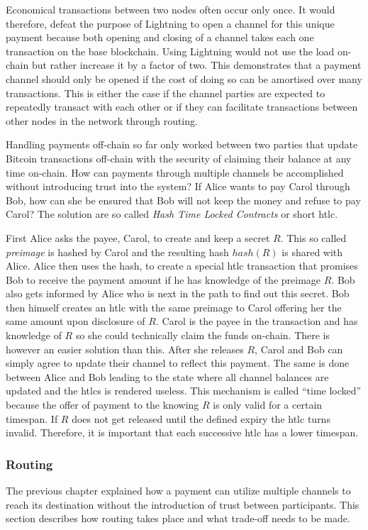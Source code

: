 \documentclass[final]{fhnwreport}       %
\begin{document}
Economical transactions between two nodes often occur only once. It would therefore, defeat the purpose of Lightning to open a channel for this unique payment because both opening and closing of a channel takes each one transaction on the base \gls{blockchain}. Using Lightning would not use the load on-chain but rather increase it by a factor of two. This demonstrates that a payment channel should only be opened if the cost of doing so can be amortised over many transactions. This is either the case if the channel parties are expected to repeatedly transact with each other or if they can facilitate transactions between other nodes in the network through routing. 

Handling payments off-chain so far only worked between two parties that update Bitcoin transactions off-chain with the security of claiming their balance at any time on-chain. How can payments through multiple channels be accomplished without introducing trust into the system? If Alice wants to pay Carol through Bob, how can she be ensured that Bob will not keep the money and refuse to pay Carol? The solution are so called \emph{Hash Time Locked Contracts} or short \gls{htlc}.

First Alice asks the payee, Carol, to create and keep a secret $R$. This so called \emph{\gls{preimage}} is hashed by Carol and the resulting \gls{hash} $hash(R)$ is shared with Alice. Alice then uses the \gls{hash}, to create a special \gls{htlc} transaction that promises Bob to receive the payment amount if he has knowledge of the preimage $R$. Bob also gets informed by Alice who is next in the path to find out this secret. Bob then himself creates an \gls{htlc} with the same preimage to Carol offering her the same amount upon disclosure of $R$. Carol is the payee in the transaction and has knowledge of $R$ so she could technically claim the funds on-chain. There is however an easier solution than this. After she releases $R$, Carol and Bob can simply agree to update their channel to reflect this payment. The same is done between Alice and Bob leading to the state where all channel balances are updated and the \gls{htlc}s is rendered useless. This mechanism is called ``time locked'' because the offer of payment to the knowing $R$ is only valid for a certain timespan. If $R$ does not get released until the defined expiry the \gls{htlc} turns invalid. Therefore, it is important that each successive \gls{htlc} has a lower timespan.

\subsubsection{Routing}\label{subsec:routing}
The previous chapter explained how a payment can utilize multiple channels to reach its destination without the introduction of trust between participants. This section describes how routing takes place and what trade-off needs to be made.
\end{document}
